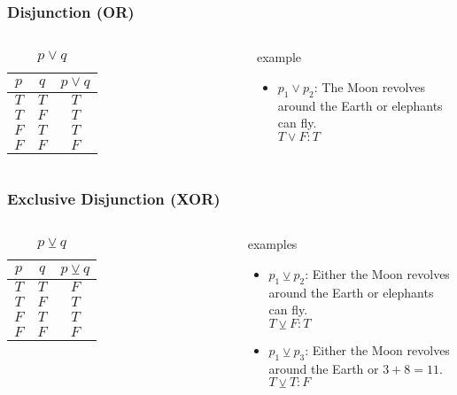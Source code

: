 \documentclass[dvipsnames]{beamer}
\begin{document}
\begin{frame}
  \frametitle{Disjunction (OR)}

  \begin{columns}
    \begin{table}
      \caption{$p \vee q$}
      \begin{tabular}{|c|c||c|}\hline
        $p$ & $q$ & $p \vee q$\\\hline\hline
        $T$ & $T$ & $T$\\\hline
        $T$ & $F$ & $T$\\\hline
        $F$ & $T$ & $T$\\\hline
        $F$ & $F$ & $F$\\\hline
      \end{tabular}
    \end{table}

    \pause
    \begin{exampleblock}{example}
      \begin{itemize}
        \item $p_1 \vee p_2$: The Moon revolves around the Earth or elephants
          can fly.\\
          $T \vee F : T$
      \end{itemize}
    \end{exampleblock}
  \end{columns}
\end{frame}

\begin{frame}
  \frametitle{Exclusive Disjunction (XOR)}

  \begin{columns}
    \begin{table}
      \caption{$p \veebar q$}
      \begin{tabular}{|c|c||c|}\hline
        $p$ & $q$ & $p \veebar q$\\\hline\hline
        $T$ & $T$ & $F$\\\hline
        $T$ & $F$ & $T$\\\hline
        $F$ & $T$ & $T$\\\hline
        $F$ & $F$ & $F$\\\hline
      \end{tabular}
    \end{table}

    \pause
    \begin{exampleblock}{examples}
      \begin{itemize}
        \item $p_1 \veebar p_2$: Either the Moon revolves around the Earth or
          elephants can fly.\\
          $T \veebar F : T$
        \item $p_1 \veebar p_3$: Either the Moon revolves around the Earth or
          $3+8=11$.\\
          $T \veebar T : F$
      \end{itemize}
    \end{exampleblock}
  \end{columns}
\end{frame}
\end{document}
